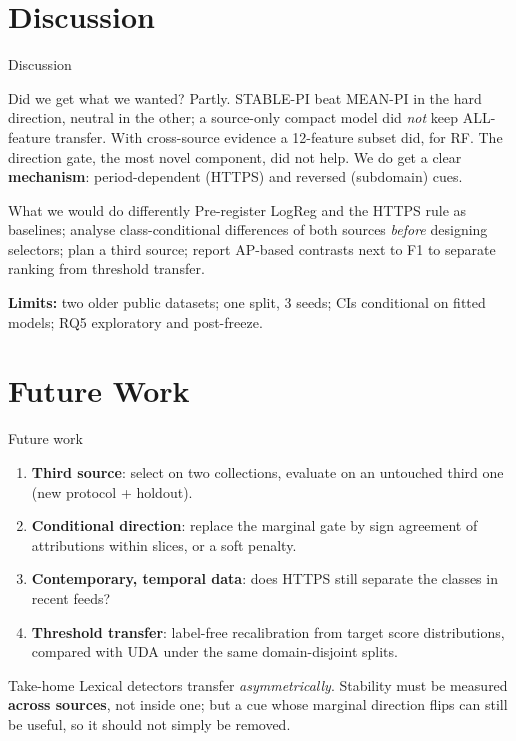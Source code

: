 \documentclass[aspectratio=169,10pt]{beamer}
\newcommand{\key}[1]{{\color{acc}\textbf{#1}}}
\begin{document}
\section{Discussion}
\begin{frame}{Discussion}
\begin{block}{Did we get what we wanted?}
Partly. STABLE-PI beat MEAN-PI in the hard direction, neutral in the other; a source-only compact model did \emph{not} keep ALL-feature transfer. With cross-source evidence a 12-feature subset did, for RF. The direction gate, the most novel component, did not help. We do get a clear \key{mechanism}: period-dependent (HTTPS) and reversed (subdomain) cues.
\end{block}
\begin{block}{What we would do differently}
Pre-register LogReg and the HTTPS rule as baselines; analyse class-conditional differences of both sources \emph{before} designing selectors; plan a third source; report AP-based contrasts next to F1 to separate ranking from threshold transfer.
\end{block}
\small\textbf{Limits:} two older public datasets; one split, 3 seeds; CIs conditional on fitted models; RQ5 exploratory and post-freeze.
\end{frame}

\section{Future Work}
\begin{frame}{Future work}
\begin{enumerate}
\item \key{Third source}: select on two collections, evaluate on an untouched third one (new protocol + holdout).
\item \key{Conditional direction}: replace the marginal gate by sign agreement of attributions within slices, or a soft penalty.
\item \key{Contemporary, temporal data}: does HTTPS still separate the classes in recent feeds?
\item \key{Threshold transfer}: label-free recalibration from target score distributions, compared with UDA under the same domain-disjoint splits.
\end{enumerate}
\vspace{1em}
\begin{block}{Take-home}
Lexical detectors transfer \emph{asymmetrically}. Stability must be measured \key{across sources}, not inside one; but a cue whose marginal direction flips can still be useful, so it should not simply be removed.
\end{block}
\end{frame}
\end{document}
